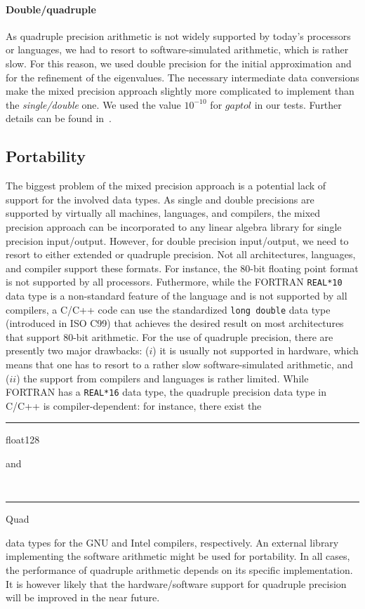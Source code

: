 \documentclass[final]{siamltex}
\begin{document}
\paragraph{Double/quadruple} As quadruple precision arithmetic is not
  widely supported by today's processors or languages, we had to resort to
  software-simulated arithmetic, which is rather slow. For this reason, we
  used double precision for the initial approximation and for the refinement
  of the eigenvalues. The necessary intermediate data conversions make the
  mixed precision approach slightly more complicated to implement than
  the {\it single/double} one. 
  We used the value $10^{-10}$ for $gaptol$ in our tests. Further details
  can be found in~\cite{mixedtr}.  

\subsection{Portability} The biggest problem of the mixed precision approach
is a potential lack of support for the involved data types. As single and
double precisions are supported by 
virtually all machines, languages, and compilers, the mixed precision
approach can be incorporated to any linear algebra library for single
precision input/output. However, for double precision input/output, we
need to resort to either 
extended or quadruple precision.  
Not all architectures, languages, and compiler support these formats. For
instance, the 80-bit floating point format is not supported by all
processors. Futhermore, while the FORTRAN {\tt REAL*10} data
type is a non-standard feature of the language and is not supported by all
compilers, a C/C++ code can use the standardized {\tt long double} data type
(introduced in ISO C99) that achieves the 
desired result on most architectures that support 80-bit arithmetic. 
For the use of quadruple precision, there are presently two major drawbacks:
($i$) it is usually not supported in hardware, which means that one has to resort to
a rather slow software-simulated arithmetic, and ($ii$) the support from compilers  
and languages is rather limited. 
While FORTRAN has a {\tt REAL*16}
data type, the quadruple precision data type in C/C++ is compiler-dependent:
  for instance, there exist the {\tt \rule{8pt}{0.5pt}float128} and {\tt
  \rule{4pt}{0.5pt}Quad} data types for the GNU and Intel
compilers, respectively. An external library implementing the
software arithmetic might be used for portability. In all cases, the
performance of quadruple arithmetic depends on its specific 
implementation. It is however likely that the hardware/software support for
quadruple precision will be improved in the near future.  
\end{document}
